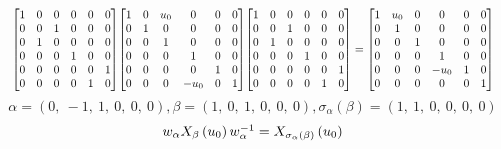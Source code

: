 \documentclass[11pt]{article}
\theoremstyle{definition}
\begin{document}
\[
\scaletoalign{\textwidth}{{\left[\begin{matrix}1 & 0 & 0 & 0 & 0 & 0\\0 & 0 & 1 & 0 & 0 & 0\\0 & 1 & 0 & 0 & 0 & 0\\0 & 0 & 0 & 1 & 0 & 0\\0 & 0 & 0 & 0 & 0 & 1\\0 & 0 & 0 & 0 & 1 & 0\end{matrix}\right]} {\left[\begin{matrix}1 & 0 & u_{0} & 0 & 0 & 0\\0 & 1 & 0 & 0 & 0 & 0\\0 & 0 & 1 & 0 & 0 & 0\\0 & 0 & 0 & 1 & 0 & 0\\0 & 0 & 0 & 0 & 1 & 0\\0 & 0 & 0 & - u_{0} & 0 & 1\end{matrix}\right]} {\left[\begin{matrix}1 & 0 & 0 & 0 & 0 & 0\\0 & 0 & 1 & 0 & 0 & 0\\0 & 1 & 0 & 0 & 0 & 0\\0 & 0 & 0 & 1 & 0 & 0\\0 & 0 & 0 & 0 & 0 & 1\\0 & 0 & 0 & 0 & 1 & 0\end{matrix}\right]} = {\left[\begin{matrix}1 & u_{0} & 0 & 0 & 0 & 0\\0 & 1 & 0 & 0 & 0 & 0\\0 & 0 & 1 & 0 & 0 & 0\\0 & 0 & 0 & 1 & 0 & 0\\0 & 0 & 0 & - u_{0} & 1 & 0\\0 & 0 & 0 & 0 & 0 & 1\end{matrix}\right]}}
\]
\[
\alpha = \left( 0, \  -1, \  1, \  0, \  0, \  0\right), \beta = \left( 1, \  0, \  1, \  0, \  0, \  0\right), \sigma_{\alpha}(\beta) = \left( 1, \  1, \  0, \  0, \  0, \  0\right)
\]
\[
\scaletoalign{\textwidth}{w_{\alpha} X_{\beta}\left(u_{0}\right) w_{\alpha}^{-1} = X_{\sigma_{\alpha}\left(\beta\right)}\left(u_{0}\right)}
\]
\end{document}

